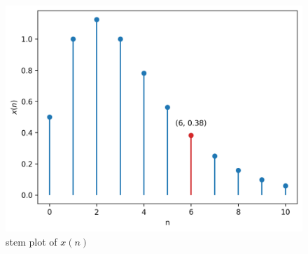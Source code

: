 \documentclass[journal,12pt,twocolumn]{IEEEtran}
\theoremstyle{remark}
\begin{document}
\begin{figure}[h!]
    \centering
    \includegraphics[width=\columnwidth]{figs/plot.png}
    \caption{stem plot of $x(n)$}
    \label{fig:1}
\end{figure}
\end{document}
